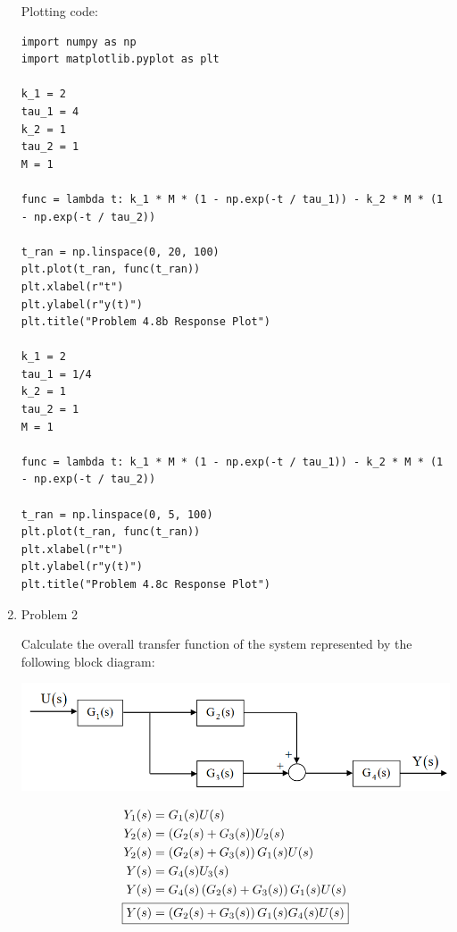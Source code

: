 \documentclass[12pt]{article}
\begin{document}
\begin{enumerate}
Plotting code:

\begin{verbatim}
import numpy as np
import matplotlib.pyplot as plt

k_1 = 2
tau_1 = 4
k_2 = 1
tau_2 = 1
M = 1

func = lambda t: k_1 * M * (1 - np.exp(-t / tau_1)) - k_2 * M * (1 - np.exp(-t / tau_2))

t_ran = np.linspace(0, 20, 100)
plt.plot(t_ran, func(t_ran))
plt.xlabel(r"t")
plt.ylabel(r"y(t)")
plt.title("Problem 4.8b Response Plot")

k_1 = 2
tau_1 = 1/4
k_2 = 1
tau_2 = 1
M = 1

func = lambda t: k_1 * M * (1 - np.exp(-t / tau_1)) - k_2 * M * (1 - np.exp(-t / tau_2))

t_ran = np.linspace(0, 5, 100)
plt.plot(t_ran, func(t_ran))
plt.xlabel(r"t")
plt.ylabel(r"y(t)")
plt.title("Problem 4.8c Response Plot")
\end{verbatim}

\newpage
\item Problem 2

Calculate the overall transfer function of the system represented by the following block
diagram:

\includegraphics[scale=0.8]{p2.png}

\begin{align*}
    Y_1(s) &= G_1(s) U(s) \\
    Y_2(s) &= (G_2(s) + G_3(s)) U_2(s) \\
    Y_2(s) &= \left(G_2(s) + G_3(s)\right) G_1(s) U(s) \\
    Y(s) &= G_4(s) U_3(s) \\
    Y(s) &= G_4(s) \left(G_2(s) + G_3(s)\right) G_1(s) U(s) \\
    \Aboxed{Y(s) &= \left(G_2(s) + G_3(s)\right) G_1(s) G_4(s) U(s)}
\end{align*}



\end{enumerate}
\end{document}
